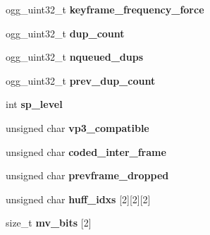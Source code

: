 \begin{DoxyCompactItemize}
\item 
\hypertarget{structth__enc__ctx_aa4e1f512f9da1b1f5c23382020f26876}{ogg\+\_\+uint32\+\_\+t {\bfseries keyframe\+\_\+frequency\+\_\+force}}\label{structth__enc__ctx_aa4e1f512f9da1b1f5c23382020f26876}

\item 
\hypertarget{structth__enc__ctx_a021c0673288afa86043ebf6cce8c42a7}{ogg\+\_\+uint32\+\_\+t {\bfseries dup\+\_\+count}}\label{structth__enc__ctx_a021c0673288afa86043ebf6cce8c42a7}

\item 
\hypertarget{structth__enc__ctx_a67768d2b81ca773c56b87b67297fa20a}{ogg\+\_\+uint32\+\_\+t {\bfseries nqueued\+\_\+dups}}\label{structth__enc__ctx_a67768d2b81ca773c56b87b67297fa20a}

\item 
\hypertarget{structth__enc__ctx_a9fa54d17e0fb3001ba83c46553c7d76b}{ogg\+\_\+uint32\+\_\+t {\bfseries prev\+\_\+dup\+\_\+count}}\label{structth__enc__ctx_a9fa54d17e0fb3001ba83c46553c7d76b}

\item 
\hypertarget{structth__enc__ctx_a5e5308b58c37a5e109212db58eceb518}{int {\bfseries sp\+\_\+level}}\label{structth__enc__ctx_a5e5308b58c37a5e109212db58eceb518}

\item 
\hypertarget{structth__enc__ctx_af849d1def9199ce49e2b0dfddebb8666}{unsigned char {\bfseries vp3\+\_\+compatible}}\label{structth__enc__ctx_af849d1def9199ce49e2b0dfddebb8666}

\item 
\hypertarget{structth__enc__ctx_a3de9c015aeab7366b68c1747fa26ec4a}{unsigned char {\bfseries coded\+\_\+inter\+\_\+frame}}\label{structth__enc__ctx_a3de9c015aeab7366b68c1747fa26ec4a}

\item 
\hypertarget{structth__enc__ctx_aeeb2a671960ab272d294af2e9a22d7a9}{unsigned char {\bfseries prevframe\+\_\+dropped}}\label{structth__enc__ctx_aeeb2a671960ab272d294af2e9a22d7a9}

\item 
\hypertarget{structth__enc__ctx_a709bfb31fc26be458134adb5a6d09d8c}{unsigned char {\bfseries huff\+\_\+idxs} \mbox{[}2\mbox{]}\mbox{[}2\mbox{]}\mbox{[}2\mbox{]}}\label{structth__enc__ctx_a709bfb31fc26be458134adb5a6d09d8c}

\item 
\hypertarget{structth__enc__ctx_a970ef361d061d56810a9931e213570ed}{size\+\_\+t {\bfseries mv\+\_\+bits} \mbox{[}2\mbox{]}}\label{structth__enc__ctx_a970ef361d061d56810a9931e213570ed}


\end{DoxyCompactItemize}
